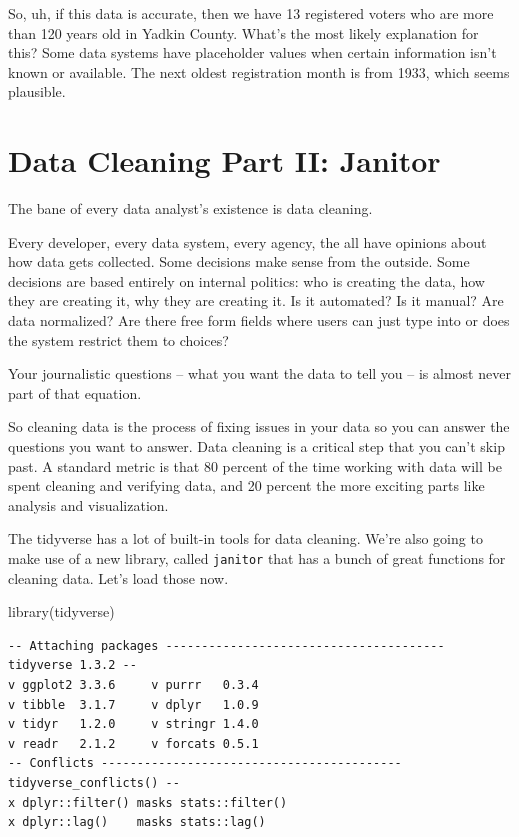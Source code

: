 \documentclass[
  letterpaper,
  DIV=11,
  numbers=noendperiod]{scrreprt}
\newenvironment{Shaded}{\begin{snugshade}}{\end{snugshade}}
\newcommand{\FunctionTok}[1]{\textcolor[rgb]{0.28,0.35,0.67}{#1}}
\newcommand{\NormalTok}[1]{\textcolor[rgb]{0.00,0.23,0.31}{#1}}
\begin{document}
So, uh, if this data is accurate, then we have 13 registered voters who
are more than 120 years old in Yadkin County. What's the most likely
explanation for this? Some data systems have placeholder values when
certain information isn't known or available. The next oldest
registration month is from 1933, which seems plausible.


\hypertarget{data-cleaning-part-ii-janitor}{%
\chapter{Data Cleaning Part II:
Janitor}\label{data-cleaning-part-ii-janitor}}

The bane of every data analyst's existence is data cleaning.

Every developer, every data system, every agency, the all have opinions
about how data gets collected. Some decisions make sense from the
outside. Some decisions are based entirely on internal politics: who is
creating the data, how they are creating it, why they are creating it.
Is it automated? Is it manual? Are data normalized? Are there free form
fields where users can just type into or does the system restrict them
to choices?

Your journalistic questions -- what you want the data to tell you -- is
almost never part of that equation.

So cleaning data is the process of fixing issues in your data so you can
answer the questions you want to answer. Data cleaning is a critical
step that you can't skip past. A standard metric is that 80 percent of
the time working with data will be spent cleaning and verifying data,
and 20 percent the more exciting parts like analysis and visualization.

The tidyverse has a lot of built-in tools for data cleaning. We're also
going to make use of a new library, called \texttt{janitor} that has a
bunch of great functions for cleaning data. Let's load those now.

\begin{Shaded}
\begin{Highlighting}[]
\FunctionTok{library}\NormalTok{(tidyverse)}
\end{Highlighting}
\end{Shaded}

\begin{verbatim}
-- Attaching packages --------------------------------------- tidyverse 1.3.2 --
v ggplot2 3.3.6     v purrr   0.3.4
v tibble  3.1.7     v dplyr   1.0.9
v tidyr   1.2.0     v stringr 1.4.0
v readr   2.1.2     v forcats 0.5.1
-- Conflicts ------------------------------------------ tidyverse_conflicts() --
x dplyr::filter() masks stats::filter()
x dplyr::lag()    masks stats::lag()
\end{verbatim}
\end{document}
